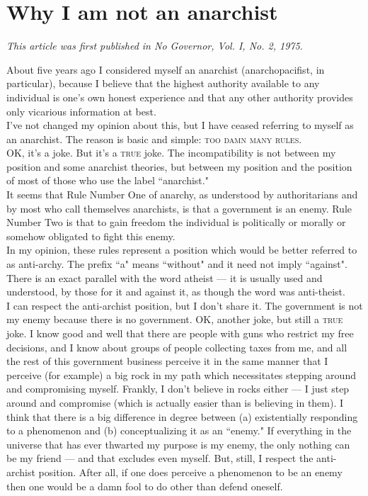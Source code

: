 \chapter{Why I am not an anarchist}

\emph{This article was first published in No Governor, Vol. I, No. 2, 1975.\\}

About five years ago I considered myself an anarchist (anarchopacifist, in particular), because I believe that the highest authority available to any individual is one's own honest experience and that any other authority provides only vicarious information at best.\\
I've not changed my opinion about this, but I have ceased referring to myself as an anarchist. The reason is basic and simple: \textsc{too damn many rules}.\\
OK, it's a joke. But it's a \textsc{true} joke. The incompatibility is not between my position and some anarchist theories, but between my position and the position of most of those who use the label ``anarchist."\\
It seems that Rule Number One of anarchy, as understood by authoritarians and by most who call themselves anarchists, is that a government is an enemy. Rule Number Two is that to gain freedom the individual is politically or morally or somehow obligated to fight this enemy.\\
In my opinion, these rules represent a position which would be better referred to as anti-archy. The prefix ``a" means ``without" and it need not imply ``against". There is an exact parallel with the word atheist --- it is usually used and understood, by those for it and against it, as though the word was anti-theist.\\
I can respect the anti-archist position, but I don't share it. The government is not my enemy because there is no government. OK, another joke, but still a \textsc{true} joke. I know good and well that there are people with guns who restrict my free decisions, and I know about groups of people collecting taxes from me, and all the rest of this government business perceive it in the same manner that I perceive (for example) a big rock in my path which necessitates stepping around and compromising myself. Frankly, I don't believe in rocks either --- I just step around and compromise (which is actually easier than is believing in them). I think that there is a big difference in degree between (a) existentially responding to a phenomenon and (b) conceptualizing it as an ``enemy." If everything in the universe that has ever thwarted my purpose is my enemy, the only nothing can be my friend --- and that excludes even myself. But, still, I respect the anti-archist position. After all, if one does perceive a phenomenon to be an enemy then one would be a damn fool to do other than defend oneself.\\
